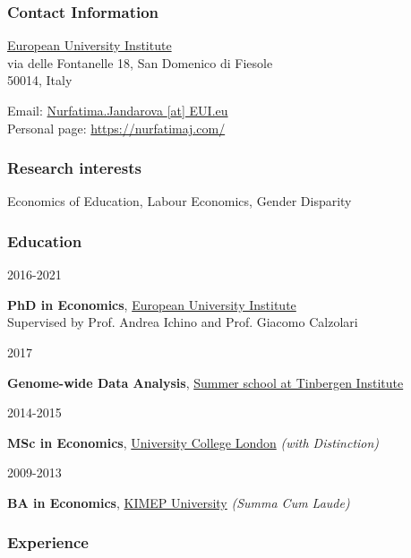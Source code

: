 \documentclass[
  american,
]{article}
\begin{document}
\hypertarget{contact-information}{%
\subsubsection{Contact Information}\label{contact-information}}

\href{https://www.eui.eu/}{{European University Institute}\\
} {via delle Fontanelle 18, San Domenico di Fiesole}\\
{50014, Italy}

\protect\hypertarget{person-email}{}{ Email:
\href{mailto:Nurfatima.Jandarova\%20\%5Bat\%5D\%20EUI.eu}{Nurfatima.Jandarova
{[}at{]} EUI.eu}}\\
Personal page: \url{https://nurfatimaj.com/}

\hypertarget{research-interests}{%
\subsubsection{Research interests}\label{research-interests}}

Economics of Education, Labour Economics, Gender Disparity

\hypertarget{education}{}
\hypertarget{education}{%
\subsubsection{Education}\label{education}}

2016-2021

\textbf{PhD in Economics}, \href{https://www.eui.eu}{European University
Institute}\\
Supervised by Prof. Andrea Ichino and Prof. Giacomo Calzolari

2017

\textbf{Genome-wide Data Analysis},
\href{https://www.tinbergen.nl/home}{Summer school at Tinbergen
Institute}

2014-2015

\textbf{MSc in Economics}, \href{https://www.ucl.ac.uk}{University
College London} \emph{(with Distinction)}

2009-2013

\textbf{BA in Economics}, \href{https://www.kimep.kz/en}{KIMEP
University} \emph{(Summa Cum Laude)}

\hypertarget{experience}{}
\hypertarget{experience}{%
\subsubsection{Experience}\label{experience}}
\end{document}
